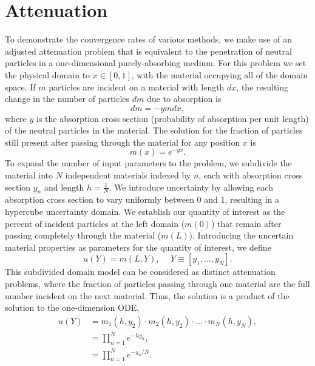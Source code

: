 \section{Attenuation}
To demonstrate the convergence rates of various methods, we make use of an adjusted attenuation problem that
is equivalent to the penetration of neutral particles in a one-dimensional purely-absorbing medium.  For this
problem we set the physical domain to $x\in[0,1]$, with the material occupying all of the domain space.  If $m$
particles are incident on a material with length $dx$, the resulting change in the number of particles $dm$
due to absorption is
\begin{equation}
  dm = -y m dx,
\end{equation}
where $y$ is the absorption cross section (probability of absorption per unit length) of the neutral particles
in the material.  The solution for the fraction of particles still present after passing through the material
for any position $x$ is
\begin{equation}
  m(x) = e^{-yx}.
\end{equation}
To expand the number of input parameters to the problem, we subdivide the material into $N$ independent
materials indexed by $n$, each with absorption cross section $y_n$ and length $h=\frac{1}{N}$.  We introduce uncertainty
by allowing each absorption cross section to vary uniformly between 0 and 1, resulting in a hypercube
uncertainty domain.  We establish our quantity of interest as the percent of incident particles at the left
domain ($m(0)$) that remain after passing completely through the material ($m(L)$).  Introducing the
uncertain material properties as parameters for the quantity of interest, we define
\begin{equation}
  u(Y) = m(L,Y),\hspace{15pt}Y\equiv[y_1,\ldots,y_N].
\end{equation}
This subdivided domain model can be considered as distinct attenuation problems, where the fraction of
particles passing through one material are the full number incident on the next material.  Thus, the solution
is a product of the solution to the one-dimension ODE,
\begin{align}
  u(Y) &= m_1(h,y_2)\cdot m_2(h,y_2)\cdot\ldots\cdot m_N(h,y_N),\\
    &= \prod_{n=1}^N e^{-h y_n},\\
    &= \prod_{n=1}^N e^{-y_n/N}.
\end{align}

